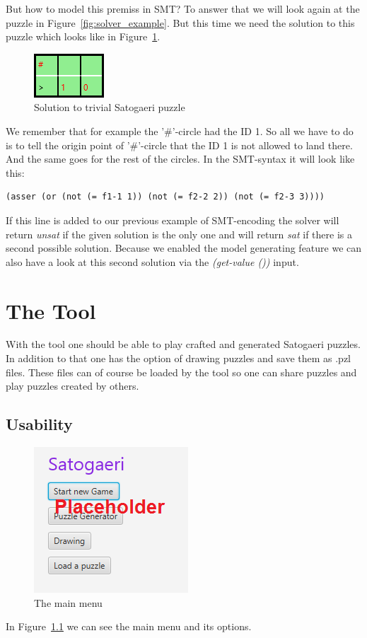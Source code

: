 But how to model this premiss in SMT? To answer that we will look again at the puzzle in Figure~\ref{fig:solver_example}. But this time we need the solution to this puzzle which looks like in Figure~\ref{fig:solver_example_solution}.
\begin{figure}
  \centering
  \includegraphics[scale=1]{Pictures/solver_example_solution.png} 
  \caption{Solution to trivial Satogaeri puzzle}
  \label{fig:solver_example_solution}
\end{figure}
We remember that for example the '\#'-circle had the ID 1. So all we have to do is to tell the origin point of '\#'-circle that the ID 1 is not allowed to land there. And the same goes for the rest of the circles. In the SMT-syntax it will look like this:
\begin{lstlisting}
(asser (or (not (= f1-1 1)) (not (= f2-2 2)) (not (= f2-3 3))))
\end{lstlisting}
If this line is added to our previous example of SMT-encoding the solver will return \emph{unsat} if the given solution is the only one and will return \emph{sat} if there is a second possible solution. Because we enabled the model generating feature we can also have a look at this second solution via the \emph{(get-value ())} input.

\chapter{The Tool} \label{The Tool}
With the tool one should be able to play crafted and generated Satogaeri puzzles. In addition to that one has the option of drawing puzzles and save them as .pzl files. These files can of course be loaded by the tool so one can share puzzles and play puzzles created by others.

\section{Usability}
\begin{figure}
  \centering
  \includegraphics[scale=1]{Pictures/main_menu.png} 
  \caption{The main menu}
  \label{fig:main_menu}
\end{figure}
In Figure~\ref{fig:main_menu} we can see the main menu and its options.

